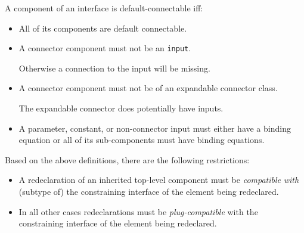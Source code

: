 \begin{definition}
A component of an interface is default-connectable iff:
\begin{itemize}
\item
  All of its components are default connectable.
\item
  A connector component must not be an \lstinline!input!.
  \begin{nonnormative}
  Otherwise a connection to the input will be missing.
  \end{nonnormative}
\item
  A connector component must not be of an expandable connector class.
  \begin{nonnormative}
  The expandable connector does potentially have inputs.
  \end{nonnormative}
\item
  A parameter, constant, or non-connector input must either have a binding equation or all of its sub-components must have binding equations.
\end{itemize}
\end{definition}

Based on the above definitions, there are the following restrictions:
\begin{itemize}
\item
  A redeclaration of an inherited top-level component must be \emph{compatible} \emph{with} (subtype of) the constraining interface of the element being redeclared.
\item
  In all other cases redeclarations must be \emph{plug-compatible} with the constraining interface of the element being redeclared.
\end{itemize}

